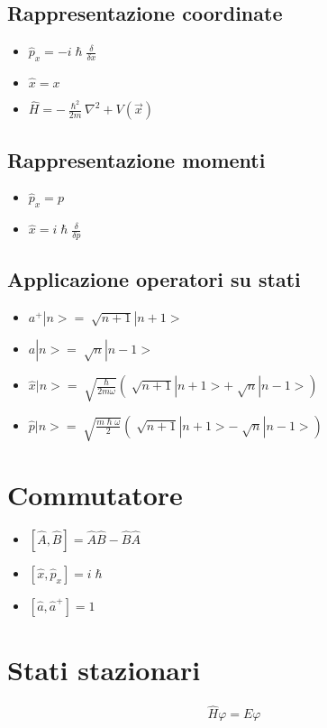 \documentclass[a4paper,11pt]{report}
\theoremstyle{remark}
\theoremstyle{definition}
\begin{document}
\subsection{Rappresentazione coordinate}
\begin{itemize}
    \item $\hat{p}_x = -i\hslash \frac{\delta}{\delta x}$
    \item $\hat{x} = x$
    \item $\hat{H} =-\frac{\hslash^2}{2m}\nabla^2 + V(\vec{x})$
\end{itemize}
\subsection{Rappresentazione momenti}
\begin{itemize}
    \item $\hat{p}_x = p$
    \item $\hat{x} = i\hslash\frac{\delta}{\delta p}$
\end{itemize}
\subsection{Applicazione operatori su stati}
\begin{itemize}
    \item $a^+|n> = \sqrt[]{n+1}|n+1>$
    \item $a|n> = \sqrt[]{n}|n-1>$
    \item $\hat{x}|n> = \sqrt[]{\frac{\hslash}{2m\omega}}(\sqrt[]{n+1}|n+1> + \sqrt[]{n}|n-1>)$
    \item $\hat{p}|n> = \sqrt[]{\frac{m\hslash\omega}{2}}(\sqrt[]{n+1}|n+1> - \sqrt[]{n}|n-1>)$
\end{itemize}

\section{Commutatore}
\begin{itemize}
    \item $[\hat{A},\hat{B}] = \hat{A}\hat{B}-\hat{B}\hat{A}$
    \item $[\hat{x},\hat{p}_x] = i\hslash$
    \item $[\hat{a},\hat{a}^+] = 1$
\end{itemize}

\section{Stati stazionari}
\begin{equation*}
    \hat{H}\varphi = E\varphi  
\end{equation*}
\end{document}
